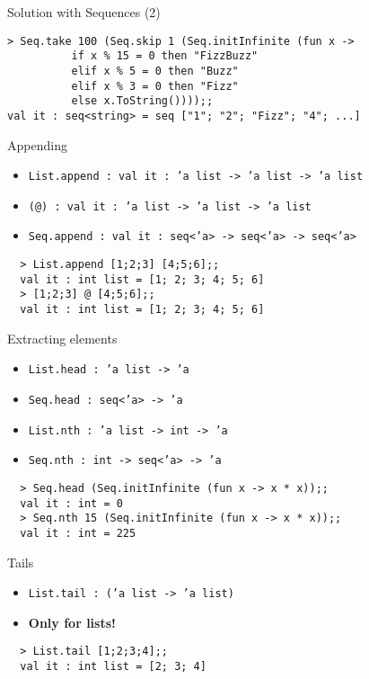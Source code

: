 \documentclass{beamer}
\begin{document}
\begin{frame}[fragile]{Solution with Sequences (2)}
  \begin{verbatim}
> Seq.take 100 (Seq.skip 1 (Seq.initInfinite (fun x -> 
          if x % 15 = 0 then "FizzBuzz"
          elif x % 5 = 0 then "Buzz"
          elif x % 3 = 0 then "Fizz"
          else x.ToString())));;
val it : seq<string> = seq ["1"; "2"; "Fizz"; "4"; ...]
  \end{verbatim}
\end{frame}

\begin{frame}[fragile]{Appending}
  \tiny
  \begin{itemize}
    \item \texttt{List.append : val it : 'a list -> 'a list -> 'a list}
    \item \texttt{(@) : val it : 'a list -> 'a list -> 'a list}
    \item \texttt{Seq.append : val it : seq<'a> -> seq<'a> -> seq<'a>}
  \end{itemize}
  \begin{verbatim}
  > List.append [1;2;3] [4;5;6];;
  val it : int list = [1; 2; 3; 4; 5; 6]
  > [1;2;3] @ [4;5;6];;
  val it : int list = [1; 2; 3; 4; 5; 6]
  \end{verbatim}
\end{frame}

\begin{frame}[fragile]{Extracting elements}
  \begin{itemize}
    \item \texttt{List.head : 'a list -> 'a}
    \item \texttt{Seq.head : seq<'a> -> 'a}
    \item \texttt{List.nth : 'a list -> int -> 'a}
    \item \texttt{Seq.nth : int -> seq<'a> -> 'a}
  \end{itemize}
  \begin{verbatim}
  > Seq.head (Seq.initInfinite (fun x -> x * x));;
  val it : int = 0
  > Seq.nth 15 (Seq.initInfinite (fun x -> x * x));;
  val it : int = 225
  \end{verbatim}
\end{frame}

\begin{frame}[fragile]{Tails}
  \begin{itemize}
    \item \texttt{List.tail : ('a list -> 'a list)}
    \item \textbf{Only for lists!}
  \end{itemize}
  \begin{verbatim}
  > List.tail [1;2;3;4];;
  val it : int list = [2; 3; 4]
  \end{verbatim}
\end{frame}
\end{document}
